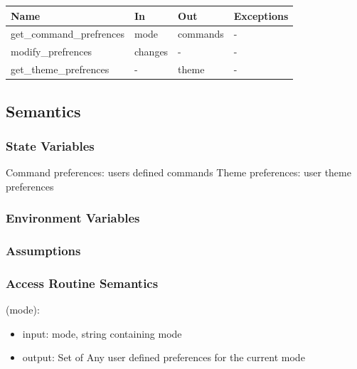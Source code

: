 \documentclass[12pt, titlepage]{article}
\begin{document}
\begin{center}
\begin{tabular}{p{4.5cm} p{2cm} p{4cm} p{2cm}}
\hline
\textbf{Name} & \textbf{In} & \textbf{Out} & \textbf{Exceptions} \\
\hline
{get\_command\_prefrences} & mode & commands & - \\
\hline
{modify\_prefrences} & changes & - & - \\
\hline
{get\_theme\_prefrences} & - & theme & - \\
\hline
\end{tabular}
\end{center}

\subsection{Semantics}

\subsubsection{State Variables}
Command preferences: users defined commands
Theme preferences: user theme preferences

\subsubsection{Environment Variables}
%

\subsubsection{Assumptions}
%

\subsubsection{Access Routine Semantics}

(mode):
\begin{itemize}
\item input: mode, string containing mode
\item output: Set of Any user defined preferences for the current mode
\end{itemize}
\end{document}
